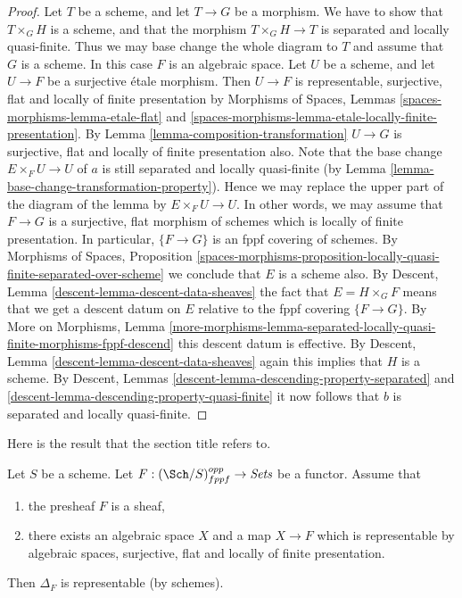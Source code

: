 \begin{proof}
Let $T$ be a scheme, and let $T \to G$ be a morphism.
We have to show that $T \times_G H$ is a scheme, and that
the morphism $T \times_G H \to T$ is separated and
locally quasi-finite. Thus we may base change the whole diagram to $T$
and assume that $G$ is a scheme. In this case $F$ is an algebraic space.
Let $U$ be a scheme, and let $U \to F$ be a surjective \'etale morphism.
Then $U \to F$ is representable, surjective, flat and
locally of finite presentation by
Morphisms of Spaces,
Lemmas \ref{spaces-morphisms-lemma-etale-flat} and
\ref{spaces-morphisms-lemma-etale-locally-finite-presentation}.
By
Lemma \ref{lemma-composition-transformation}
$U \to G$ is surjective, flat and locally of finite presentation also.
Note that the base change $E \times_F U \to U$ of $a$ is still
separated and locally quasi-finite (by
Lemma \ref{lemma-base-change-transformation-property}). Hence we
may replace the upper part of the diagram of the lemma by
$E \times_F U \to U$. In other words, we may assume that
$F \to G$ is a surjective, flat morphism of schemes
which is locally of finite presentation.
In particular, $\{F \to G\}$ is an fppf covering of schemes.
By
Morphisms of Spaces, Proposition
\ref{spaces-morphisms-proposition-locally-quasi-finite-separated-over-scheme}
we conclude that $E$ is a scheme also.
By
Descent, Lemma \ref{descent-lemma-descent-data-sheaves}
the fact that $E = H \times_G F$ means that we get a descent datum
on $E$ relative to the fppf covering $\{F \to G\}$.
By
More on Morphisms, Lemma
\ref{more-morphisms-lemma-separated-locally-quasi-finite-morphisms-fppf-descend}
this descent datum is effective.
By
Descent, Lemma \ref{descent-lemma-descent-data-sheaves}
again this implies that $H$ is a scheme.
By
Descent, Lemmas \ref{descent-lemma-descending-property-separated} and
\ref{descent-lemma-descending-property-quasi-finite}
it now follows that $b$ is separated and locally quasi-finite.
\end{proof}

\noindent
Here is the result that the section title refers to.

\begin{lemma}
\label{lemma-bootstrap-diagonal}
Let $S$ be a scheme.
Let $F : (\Sch/S)_{fppf}^{opp} \to \textit{Sets}$ be a functor.
Assume that
\begin{enumerate}
\item the presheaf $F$ is a sheaf,
\item there exists an algebraic space $X$ and a map $X \to F$
which is representable by algebraic spaces, surjective, flat and
locally of finite presentation.
\end{enumerate}
Then $\Delta_F$ is representable (by schemes).
\end{lemma}

